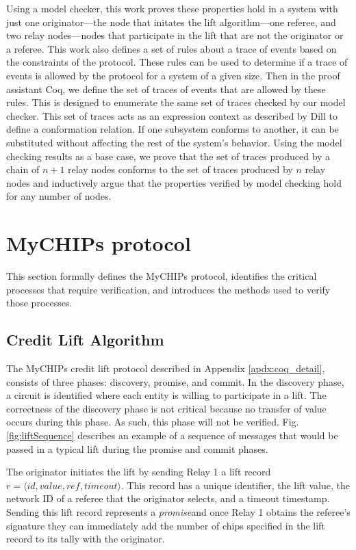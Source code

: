 \documentclass[runningheads]{llncs}
\newcommand{\promise}{\emph{promise}}
\begin{document}
Using a model checker, this work proves these properties hold in a system with just one originator---the node that initates the lift algorithm---one referee, and two relay nodes---nodes that participate in the lift that are not the originator or a referee. This work also defines a set of rules about a trace of events based on the constraints of the protocol. These rules can be used to determine if a trace of events is allowed by the protocol for a system of a given size. 
Then in the proof assistant Coq, we define the set of traces of events that are allowed by these rules. This is designed to enumerate the same set of traces checked by our model checker. This set of traces acts as an expression context as described by Dill \cite{dill_trace_theory} to define a conformation relation. If one subsystem conforms to another, it can be substituted without affecting the rest of the system's behavior. 
Using the model checking results as a base case, we prove that the set of traces produced by a chain of $n+1$ relay nodes conforms to the set of traces produced by $n$ relay nodes and inductively argue that the properties verified by model checking hold for any number of nodes.

\section{MyCHIPs protocol}
This section formally defines the MyCHIPs protocol, identifies the critical processes that require verification, and introduces the methods used to verify those processes.

\subsection{Credit Lift Algorithm}\label{sec:liftAlgorithm}
The MyCHIPs credit lift protocol described in Appendix \ref{apdx:coq_detail}, consists of three phases: discovery, promise, and commit. In the discovery phase, a circuit is identified where each entity is willing to participate in a lift. The correctness of the discovery phase is not critical because no transfer of value occurs during this phase. As such, this phase will not be verified.
Fig. \ref{fig:liftSequence} describes an example of a sequence of messages that would be passed in a typical lift during the promise and commit phases.

The originator initiates the lift by sending Relay 1 a lift record
$r = \langle id, value, ref, timeout\rangle.$ This record has a unique identifier, the lift value, the network ID of a referee that the originator selects, and a timeout timestamp. Sending this lift record represents a \promise and once Relay 1 obtains the referee's signature they can immediately add the number of chips specified in the lift record to its tally with the originator.
\end{document}
